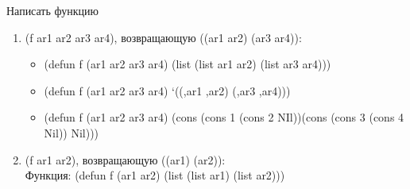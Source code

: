 Написать функцию
\begin{enumerate}
\item (f ar1 ar2 ar3 ar4), возвращающую ((ar1 ar2) (ar3 ar4)):
\begin{itemize}
\item (defun f (ar1 ar2 ar3 ar4) (list (list ar1 ar2) (list ar3 ar4)))  
\item (defun f (ar1 ar2 ar3 ar4) `((,ar1 ,ar2) (,ar3 ,ar4)))
\item (defun f (ar1 ar2 ar3 ar4) (cons (cons 1 (cons 2 NIl))(cons (cons 3 (cons 4 Nil)) Nil)))
\end{itemize}
\begin{figure}[ht!]
\end{figure}

\item (f ar1 ar2), возвращающую ((ar1) (ar2)):\\
Функция: (defun f (ar1 ar2) (list (list ar1) (list ar2)))
\begin{figure}[ht!]
\end{figure}


\end{enumerate}
